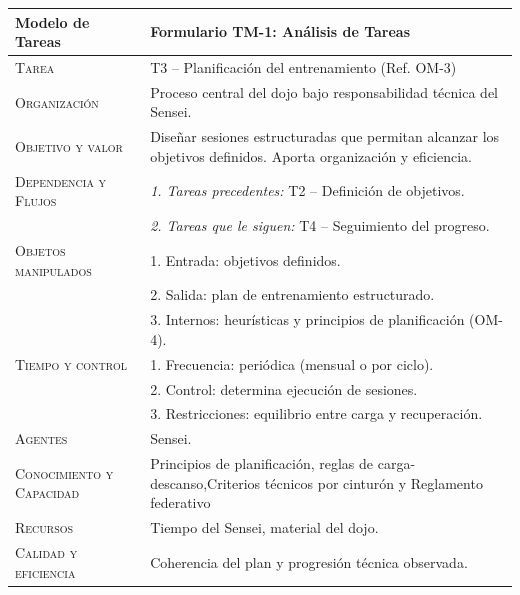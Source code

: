 \documentclass[12pt,a4paper,twoside,spanish]{article}      %
\begin{document}
        \begin{table}[H]
            \scriptsize
            \begin{tabularx}{\textwidth}{|l|X|} \hline       
                \textbf{Modelo de Tareas} & \textbf{Formulario TM-1: Análisis de Tareas} \\ \hline\hline
                
                \textsc{Tarea} & T3 – Planificación del entrenamiento (Ref. OM-3) \\ \hline
                
                \textsc{Organización}  & Proceso central del dojo bajo responsabilidad técnica del Sensei. \\ \hline
                
                \textsc{Objetivo y valor} & Diseñar sesiones estructuradas que permitan alcanzar los objetivos definidos. Aporta organización y eficiencia. \\ \hline
                
                \textsc{Dependencia y Flujos} 
                & \textit{1. Tareas precedentes:} T2 – Definición de objetivos.\\
                & \textit{2. Tareas que le siguen:} T4 – Seguimiento del progreso. \\ \hline
                
                \textsc{Objetos manipulados} 
                & 1. Entrada: objetivos definidos.\\
                & 2. Salida: plan de entrenamiento estructurado.\\
                & 3. Internos: heurísticas y principios de planificación (OM-4). \\ \hline
                
                \textsc{Tiempo y control} 
                & 1. Frecuencia: periódica (mensual o por ciclo).\\
                & 2. Control: determina ejecución de sesiones.\\
                & 3. Restricciones: equilibrio entre carga y recuperación. \\ \hline
                
                \textsc{Agentes} & Sensei. \\ \hline
                
                \textsc{Conocimiento y Capacidad} & Principios de planificación, reglas de carga-descanso,Criterios técnicos por cinturón y Reglamento federativo \\ \hline
                
                \textsc{Recursos} & Tiempo del Sensei, material del dojo. \\ \hline
                
                \textsc{Calidad y eficiencia} & Coherencia del plan y progresión técnica observada. \\ \hline
            \end{tabularx}
            \label{tab.TM1-T3}
        \end{table}
\end{document}
